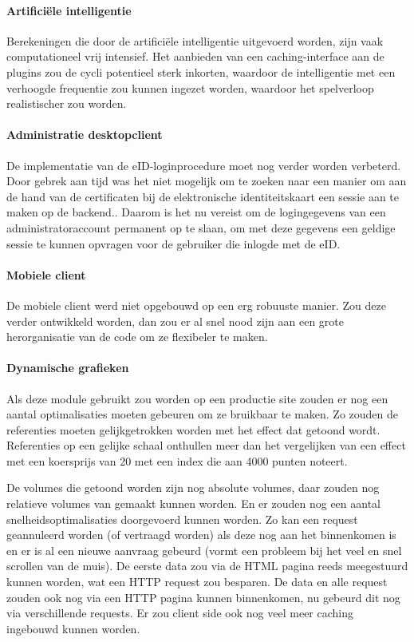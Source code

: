 \paragraph{Artifici\"ele intelligentie}

Berekeningen die door de artifici\"ele intelligentie uitgevoerd worden, zijn vaak computationeel vrij intensief. Het aanbieden van een caching-interface aan de plugins zou de cycli potentieel sterk inkorten, waardoor de intelligentie met een verhoogde frequentie zou kunnen ingezet worden, waardoor het spelverloop realistischer zou worden.

\paragraph{Administratie desktopclient} De implementatie van de eID-loginprocedure moet nog verder worden verbeterd.  Door gebrek aan tijd was het niet mogelijk om te zoeken naar een manier om aan de hand van de certificaten bij de elektronische identiteitskaart een sessie aan te maken op de backend.. Daarom is het nu vereist om de logingegevens van een administratoraccount permanent op te slaan, om met deze gegevens een geldige sessie te kunnen opvragen voor de gebruiker die inlogde met de eID.

\paragraph{Mobiele client} De mobiele client werd niet opgebouwd op een erg robuuste manier. Zou deze verder ontwikkeld worden, dan zou er al snel nood zijn aan een grote herorganisatie van de code om ze flexibeler te maken.

\paragraph{Dynamische grafieken} Als deze module gebruikt zou worden op een productie site zouden er nog een aantal optimalisaties moeten gebeuren om ze bruikbaar te maken. Zo zouden de referenties moeten gelijkgetrokken worden met het effect dat getoond wordt. Referenties op een gelijke schaal onthullen meer dan het vergelijken van een effect met een koersprijs van 20 met een index die aan 4000 punten noteert.

De volumes die getoond worden zijn nog absolute volumes, daar zouden nog relatieve volumes van gemaakt kunnen worden. En er zouden nog een aantal snelheidsoptimalisaties doorgevoerd kunnen worden. Zo kan een request geannuleerd worden (of vertraagd worden) als deze nog aan het binnenkomen is en er is al een nieuwe aanvraag gebeurd (vormt een probleem bij het veel en snel scrollen van de muis). De eerste data zou via de HTML pagina reeds meegestuurd kunnen worden, wat een HTTP request zou besparen. De data en alle request zouden ook nog via een HTTP pagina kunnen binnenkomen, nu gebeurd dit nog via verschillende requests.
Er zou client side ook nog veel meer caching ingebouwd kunnen worden.


